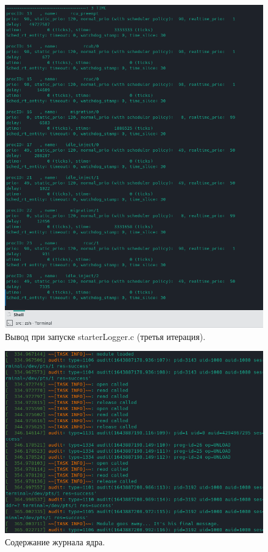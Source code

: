 \begin{figure}[H]
	\centering
	\includegraphics[scale=0.8]{img/thirdIt.png}
	\caption{Вывод при запуске starterLogger.c (третья итерация). }
	\label{fig:thirdIt}
\end{figure}

\begin{figure}[H]
	\centering
	\includegraphics[scale=0.8]{img/dmesg.png}
	\caption{Содержание журнала ядра. }
	\label{fig:dmesg}
\end{figure}

